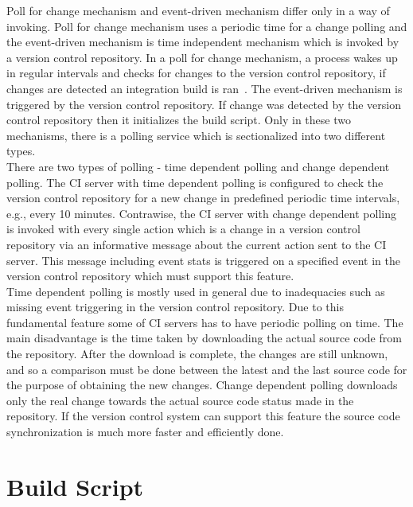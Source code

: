 Poll for change mechanism and event-driven mechanism differ only in a way of invoking. Poll for change mechanism uses a periodic time for a change polling and the event-driven mechanism is time independent mechanism which is invoked by a version control repository. In a poll for change mechanism, a process wakes up in regular intervals and checks for changes to the version control repository, if changes are detected an integration build is ran~\cite{CIbook}. The event-driven mechanism is triggered by the version control repository. If change was detected by the version control repository then it initializes the build script. Only in these two mechanisms, there is a polling service which is sectionalized into two different types.\\

There are two types of polling - time dependent polling and change dependent polling. The CI server with time dependent polling is configured to check the version control repository for a new change in predefined periodic time intervals, e.g., every 10 minutes. Contrawise, the CI server with change dependent polling is invoked with every single action which is a change in a version control repository via an informative message about the current action sent to the CI server. This message including event stats is triggered on a specified event in the version control repository which must support this feature.\\

Time dependent polling is mostly used in general due to inadequacies such as missing event triggering in the version control repository. Due to this fundamental feature some of CI servers has to have  periodic polling on time. The main disadvantage is the time taken by downloading the actual source code from the repository. After the download is complete, the changes are still unknown, and so a comparison must be done between the latest and the last source code for the purpose of obtaining the new changes. Change dependent polling downloads only the real change towards the actual source code status made in the repository. If the version control system can support this feature the source code synchronization is much more faster and efficiently done.

\section{Build Script}\label{build_script}

